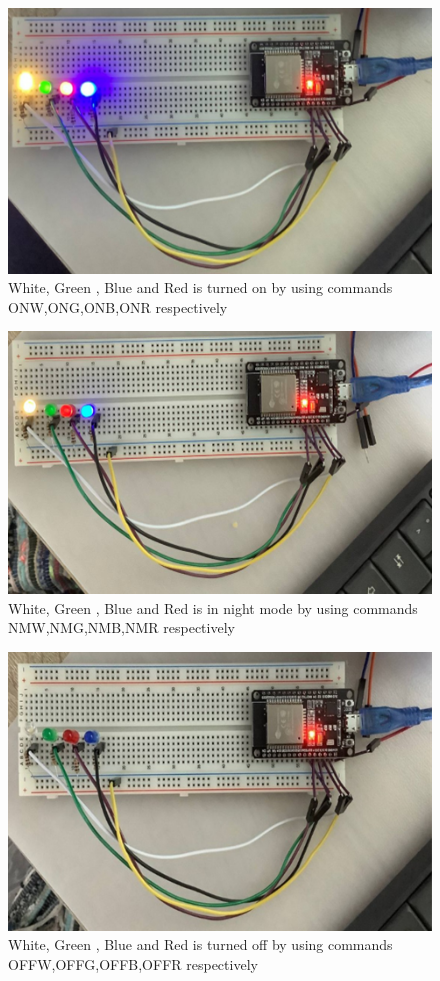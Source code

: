\begin{figure}[htbp]
\centerline{\includegraphics{image7.png}}
\caption{White, Green , Blue  and Red is turned on by using commands ONW,ONG,ONB,ONR respectively}
\label{fig}
\end{figure}




\begin{figure}[htbp]
\centerline{\includegraphics{image8.png}}
\caption{White, Green , Blue  and Red is in night mode by using commands NMW,NMG,NMB,NMR respectively}
\label{fig}
\end{figure}


\begin{figure}[htbp]
\centerline{\includegraphics{image9.png}}
\caption{White, Green , Blue  and Red is turned off by using commands OFFW,OFFG,OFFB,OFFR respectively}
\label{fig}
\end{figure}



